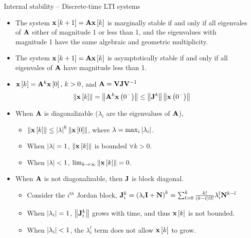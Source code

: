 \documentclass[aspectratio=169]{beamer}
\def\mf{\ensuremath\mathbf}
\def\lp{\ensuremath\left(}
\def\rp{\ensuremath\right)}
\def\lv{\ensuremath\left\lvert}
\def\rv{\ensuremath\right\rvert}
\def\lV{\ensuremath\left\lVert}
\def\rV{\ensuremath\right\rVert}
\def\ls{\ensuremath\left[}
\def\rs{\ensuremath\right]}
\newcommand{\ct}[1]{\lp #1\rp}
\newcommand{\dt}[1]{\ls #1\rs}
\begin{document}
\begin{frame}{Internal stability -- Discrete-time LTI systems}
\begin{footnotesize}
\begin{itemize}
    \item The system $\mf{x}\dt{k+1} = \mf{A}\mf{x}\dt{k}$ is marginally stable if and only if all eigenvales of $\mf{A}$ either of magnitude 1 or less than 1, and the eigenvalues with magnitude 1 have the same algebraic and geometric multiplicity.

    \item  The system $\mf{x}\dt{k+1} = \mf{A}\mf{x}\dt{k}$ is asymptotically stable if and only if all eigenvales of $\mf{A}$ have magnitude less than 1.

    \item $\mf{x}\dt{k} = \mf{A}^k\mf{x}\dt{0}, \, k > 0$, and $\mf{A} = \mf{V}\mf{J}\mf{V}^{-1}$
    \[ \lV \mf{x}\dt{k} \rV = \lV \mf{A}^k\mf{x}\ct{0^-} \rV \leq \lV \mf{J}^k \rV \lV \mf{x}\ct{0^-} \rV\]

    \item When $\mf{A}$ is diagonalizable ($\lambda_i$ are the eigenvalues of $\mf{A}$),
    \begin{itemize}
        \item {\footnotesize $\lV \mf{x}\dt{k} \rV \leq  \lv \lambda \rv^k \lV \mf{x}\dt{0} \rV$, where $\lambda = \max_i \lv \lambda_i \rv$.}
        \item {\footnotesize When $\lv \lambda \rv = 1$, $\lV \mf{x}\dt{k}\rV$ is bounded $\forall k > 0$.}
        \item {\footnotesize When $\lv \lambda \rv < 1$, $\lim_{k \to \infty} \lV \mf{x}\dt{k}\rV = 0$.}
    \end{itemize}\vspace{0.2cm}

    \item When $\mf{A}$ is not diagonalizable, then $\mf{J}$ is block diagonal.
    \begin{itemize}
        \item {\footnotesize Consider the $i^{th}$ Jordan block, $\mf{J}_i^k = \ct{\lambda_i \mf{I} + \mf{N}}^k = \sum_{l=0}^k \frac{k!}{(k - l)!l!}\lambda_i^l\mf{N}^{k - l}$}

        \item {\footnotesize When $\lv \lambda_i\rv = 1$, $\lV \mf{J}_i^k \rV$ grows with time, and thus $\mf{x}\dt{k}$ is not bounded. }

        \item {\footnotesize When $\lv \lambda_i\rv < 1$, the $\lambda_i^l$ term does not allow $\mf{x}\dt{k}$ to grow.} 
    \end{itemize}
\end{itemize}
\end{footnotesize}
\end{frame}
\end{document}
